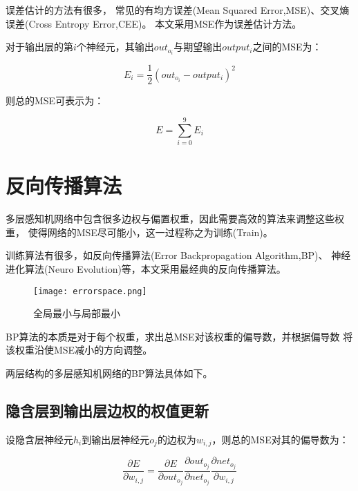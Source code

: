 \documentclass[forprint]{WHUBachelor}
\begin{document}
       误差估计的方法有很多，
       常见的有均方误差(Mean Squared Error,MSE)、交叉熵误差(Cross Entropy Error,CEE)。
       本文采用MSE作为误差估计方法。
   
       对于输出层的第$i$个神经元，其输出$out_{o_i}$与期望输出$output_i$之间的MSE为：
   
       \begin{equation}
         E_i=\frac{1}{2} (out_{o_i}-output_i)^2
       \end{equation}
   
       则总的MSE可表示为：
   
       \begin{equation}
         E=\sum_{i=0}^{9}{E_i}
       \end{equation}
   
     \section{反向传播算法}
   
       多层感知机网络中包含很多边权与偏置权重，因此需要高效的算法来调整这些权重，
       使得网络的MSE尽可能小，这一过程称之为训练(Train)。
   
       训练算法有很多，如反向传播算法(Error Backpropagation Algorithm,BP)、
       神经进化算法(Neuro Evolution)等，本文采用最经典的反向传播算法。
   
       \begin{figure}[ht]
         \centering
           \texttt{[image: errorspace.png]}
           \caption{全局最小与局部最小}
           \label{fig:3}
       \end{figure}
   
       BP算法的本质是对于每个权重，求出总MSE对该权重的偏导数，并根据偏导数
       将该权重沿使MSE减小的方向调整。
   
       两层结构的多层感知机网络的BP算法具体如下。
   
       \subsection{隐含层到输出层边权的权值更新}
         
         设隐含层神经元$h_i$到输出层神经元$o_j$的边权为$w_{i,j}$，则总的MSE对其的偏导数为：
   
         \begin{equation}
           \frac{\partial{E}}{\partial{w_{i,j}}}=
           \frac{\partial{E}}{\partial{out_{o_j}}}
           \frac{\partial{out_{o_j}}}{\partial{net_{o_j}}}
           \frac{\partial{net_{o_j}}}{\partial{w_{i,j}}}
           \label{equa11}
         \end{equation}
   
\end{document}
